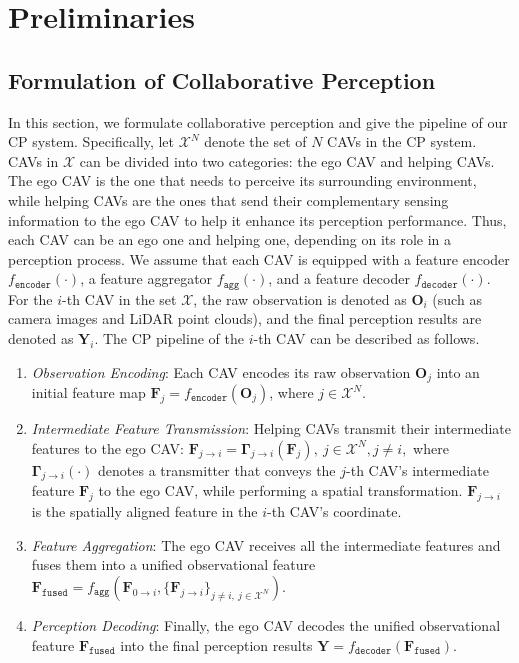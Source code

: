 \vspace{-3mm}
\section{Preliminaries}
\label{sec:preliminaries}
\subsection{Formulation of Collaborative Perception}
\label{sec:formulation}

In this section, we formulate collaborative perception and give the pipeline of our CP system. Specifically, let $\mathcal{X}^N$ denote the set of $N$ CAVs in the CP system. CAVs in $\mathcal{X}$ can be divided into two categories: the ego CAV and helping CAVs. The ego CAV is the one that needs to perceive its surrounding environment, while helping CAVs are the ones that send their complementary sensing information to the ego CAV to help it enhance its perception performance.
Thus, each CAV can be an ego one and helping one, depending on its role in a perception process. We assume that each CAV is equipped with a feature encoder $f_\mathtt{{encoder}}(\cdot)$, a feature aggregator $f_\mathtt{{agg}}(\cdot)$, and a feature decoder $f_\mathtt{{decoder}}(\cdot)$. For the $i$-th CAV in the set $\mathcal{X}$, the raw observation is denoted as $\mathbf{O}_i$ (such as camera images and LiDAR point clouds), and the final perception results are denoted as $\mathbf{Y}_i$. The CP pipeline of the $i$-th CAV can be described as follows.
\begin{enumerate}
    \setlength{\itemsep}{0pt}
    \setlength{\parskip}{0pt}
    \setlength{\parsep}{0pt}
    \item \textit{Observation Encoding}: Each CAV encodes its raw observation $\mathbf{O}_j$ into an initial feature map $\mathbf{F}_j = f_\mathtt{{encoder}}(\mathbf{O}_j)$, where $j \in \mathcal{X}^N$.
    \item \textit{Intermediate Feature Transmission}: Helping CAVs transmit their intermediate features to the ego CAV: $\mathbf{F}_{j\rightarrow i}=\mathbf{\Gamma}_{j\rightarrow i}(\mathbf{F}_j),\  j\in \mathcal{X}^N, j\neq i,$
    where $\mathbf{\Gamma}_{j\rightarrow i}(\cdot)$ denotes a transmitter that conveys the $j$-th CAV's intermediate feature $\mathbf{F}_j$ to the ego CAV, while performing a spatial transformation. $\mathbf{F}_{j\rightarrow i}$ is the spatially aligned feature in the $i$-th CAV's coordinate.
    \item \textit{Feature Aggregation}: The ego CAV receives all the intermediate features and fuses them into a unified observational feature $\mathbf{F}_\mathtt{fused}=f_\mathtt{agg}(\mathbf{F}_{0\rightarrow i}, \{\mathbf{F}_{j\rightarrow i}\}_{j\neq i,\  j\in \mathcal{X}^N})$.
    \item \textit{Perception Decoding}: Finally, the ego CAV decodes the unified observational feature $\mathbf{F}_\mathtt{fused}$ into the final perception results $\mathbf{Y}=f_\mathtt{decoder}(\mathbf{F}_\mathtt{fused})$.
\end{enumerate}


